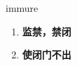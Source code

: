 
\begin{frame}
{\huge immure}
\begin{center}
\begin{enumerate}\Large
  \item \textbf{监禁，禁闭}
  \item \textbf{使闭门不出}
\end{enumerate}
\end{center}
\end{frame}
